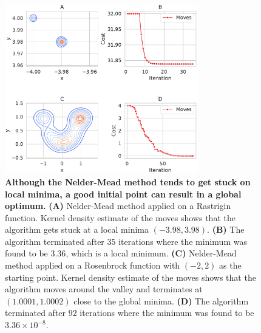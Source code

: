 \begin{figure}[H]
\center
\includegraphics[width=0.75\textwidth]{chapters/Introduction/Figures/Nelder-Mead.pdf}
\caption[Although the Nelder-Mead method tends to get stuck on local minima, a good initial point can result in a global optimum.]{\textbf{Although the Nelder-Mead method tends to get stuck on local minima, a good initial point can result in a global optimum.} \textbf{(A)} Nelder-Mead method applied on a Rastrigin function. Kernel density estimate of the moves shows that the algorithm gets stuck at a local minima $(-3.98, 3.98)$. \textbf{(B)} The algorithm terminated after $35$ iterations where the minimum was found to be $3.36$, which is a local minimum. \textbf{(C)} Nelder-Mead method applied on a Rosenbrock function with $(-2,2)$ as the starting point. Kernel density estimate of the moves shows that the algorithm moves around the valley and terminates at $(1.0001, 1.0002)$ close to the global minima. \textbf{(D)} The algorithm terminated after $92$ iterations where the minimum was found to be $3.36 \times 10^{-8}$.}%
\label{fig:nelder-mead}
\end{figure}